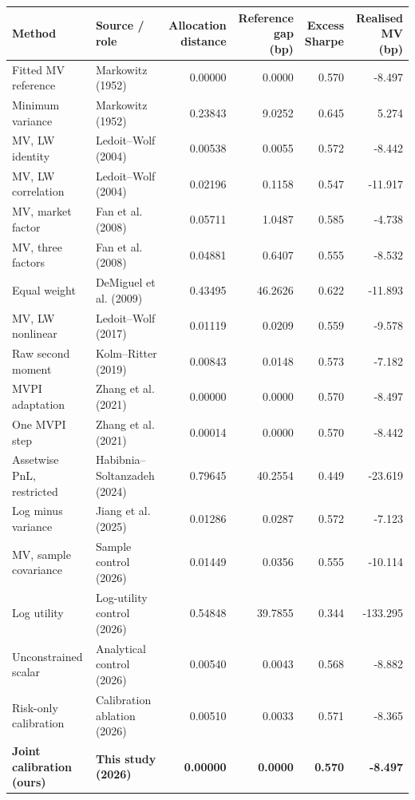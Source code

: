 \begin{tabular}{@{}p{}p{}rrrr@{}}\toprule
Method & Source / role & \shortstack{Allocation\\distance} & \shortstack{Reference gap\\(bp)} & \shortstack{Excess\\Sharpe} & \shortstack{Realised MV\\(bp)}\\\midrule
Fitted MV reference & Markowitz (1952) & 0.00000 & 0.0000 & 0.570 & -8.497 \\
Minimum variance & Markowitz (1952) & 0.23843 & 9.0252 & 0.645 & 5.274 \\
MV, LW identity & Ledoit--Wolf (2004) & 0.00538 & 0.0055 & 0.572 & -8.442 \\
MV, LW correlation & Ledoit--Wolf (2004) & 0.02196 & 0.1158 & 0.547 & -11.917 \\
MV, market factor & Fan et al. (2008) & 0.05711 & 1.0487 & 0.585 & -4.738 \\
MV, three factors & Fan et al. (2008) & 0.04881 & 0.6407 & 0.555 & -8.532 \\
Equal weight & DeMiguel et al. (2009) & 0.43495 & 46.2626 & 0.622 & -11.893 \\
MV, LW nonlinear & Ledoit--Wolf (2017) & 0.01119 & 0.0209 & 0.559 & -9.578 \\
Raw second moment & Kolm--Ritter (2019) & 0.00843 & 0.0148 & 0.573 & -7.182 \\
MVPI adaptation & Zhang et al. (2021) & 0.00000 & 0.0000 & 0.570 & -8.497 \\
One MVPI step & Zhang et al. (2021) & 0.00014 & 0.0000 & 0.570 & -8.442 \\
Assetwise PnL, restricted & Habibnia--Soltanzadeh (2024) & 0.79645 & 40.2554 & 0.449 & -23.619 \\
Log minus variance & Jiang et al. (2025) & 0.01286 & 0.0287 & 0.572 & -7.123 \\
MV, sample covariance & Sample control (2026) & 0.01449 & 0.0356 & 0.555 & -10.114 \\
Log utility & Log-utility control (2026) & 0.54848 & 39.7855 & 0.344 & -133.295 \\
Unconstrained scalar & Analytical control (2026) & 0.00540 & 0.0043 & 0.568 & -8.882 \\
Risk-only calibration & Calibration ablation (2026) & 0.00510 & 0.0033 & 0.571 & -8.365 \\
\midrule
\textbf{Joint calibration (ours)} & \textbf{This study (2026)} & \textbf{0.00000} & \textbf{0.0000} & \textbf{0.570} & \textbf{-8.497} \\
\bottomrule\end{tabular}
